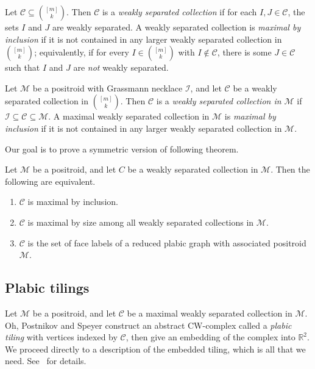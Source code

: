 \documentclass[ALCO,ThmDefs,Unicode,epreuves]{cedram}
\begin{document}
\begin{defi}Let $\mathcal{C} \subseteq \binom{[m]}{k}$. Then $\mathcal{C}$ is a \emph{weakly separated collection} if for each $I, J \in \mathcal{C}$, the sets $I$ and $J$ are weakly separated. A weakly separated collection is \emph{maximal by inclusion} if it is not contained in any larger weakly separated collection in $\binom{[m]}{k}$; equivalently, if for every $I \in \binom{[m]}{k}$ with $I \not\in \mathcal{C}$, there is some $J \in \mathcal{C}$ such that $I$ and $J$ are \emph{not} weakly separated.
\end{defi}

\begin{defi}
Let $\mathcal{M}$ be a positroid with Grassmann necklace $\mathcal{I}$, and let $\mathcal{C}$ be a weakly separated collection in $\binom{[m]}{k}$. Then $\mathcal{C}$ is a \emph{weakly separated collection in $\mathcal{M}$} if $\mathcal{I} \subseteq \mathcal{C} \subseteq \mathcal{M}$. A maximal weakly separated collection in $\mathcal{M}$ is \emph{maximal by inclusion} if it is not contained in any larger weakly separated collection in $\mathcal{M}$.
\end{defi}


Our goal is to prove a symmetric version of following theorem.

\begin{theo}
\label{ops_main}
Let $\mathcal{M}$ be a positroid, and let $C$ be a weakly separated collection in $\mathcal{M}$. Then the following are equivalent.
\begin{enumerate}%
\item $\mathcal{C}$ is maximal by inclusion.
\item $\mathcal{C}$ is maximal by size among all weakly separated collections in $\mathcal{M}$.
\item $\mathcal{C}$ is the set of face labels of a reduced plabic graph with associated positroid~$\mathcal{M}$.
\end{enumerate}
\end{theo}

\subsection{Plabic tilings}

Let $\mathcal{M}$ be a positroid, and let $\mathcal{C}$ be a maximal weakly separated collection in $\mathcal{M}$. Oh, Postnikov and Speyer construct an abstract CW-complex called a \emph{plabic tiling} with vertices indexed by $\mathcal{C}$, then give an embedding of the complex into $\mathbb{R}^2$. We proceed directly to a description of the embedded tiling, which is all that we need. See~\cite[section 9]{OPS15} for details.
\end{document}
